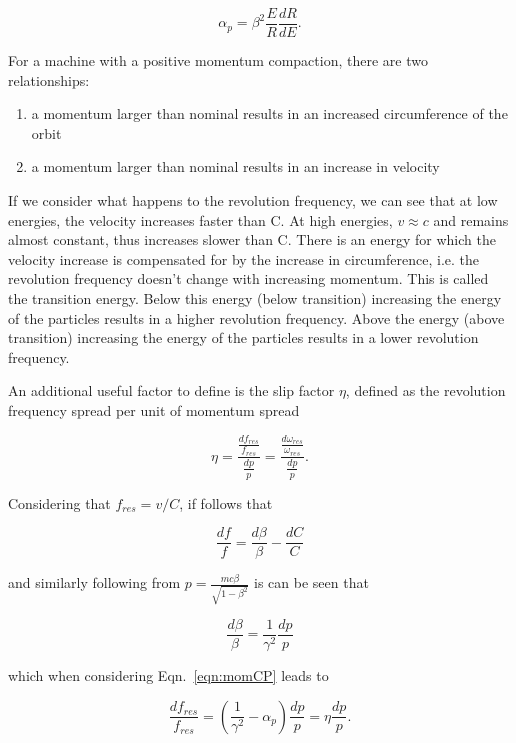 \begin{equation}
\alpha_{p} = \beta^{2}\frac{E}{R}\frac{dR}{dE}.
\end{equation}

For a machine with a positive momentum compaction, there are two relationships:

\begin{enumerate}
\item{a momentum larger than nominal results in an increased circumference of the orbit}
\item{a momentum larger than nominal results in an increase in velocity}
\end{enumerate}

If we consider what happens to the revolution frequency, we can see that at low energies, the velocity increases faster than C. At high energies, $v \approx c$ and remains almost constant, thus increases slower than C. There is an energy for which the velocity increase is compensated for by the increase in circumference, i.e. the revolution frequency doesn't change with increasing momentum. This is called the transition energy. Below this energy (below transition) increasing the energy of the particles results in a higher revolution frequency. Above the energy (above transition) increasing the energy of the particles results in a lower revolution frequency.

An additional useful factor to define is the slip factor $\eta$, defined as the revolution frequency spread per unit of momentum spread

\begin{equation}
\eta = \frac{\frac{df_{res}}{f_{res}}}{\frac{dp}{p}} = \frac{\frac{d\omega_{res}}{\omega_{res}}}{\frac{dp}{p}}.
\end{equation}

Considering that $f_{res} = v/C$, if follows that

\begin{equation}
\frac{df}{f} = \frac{d\beta}{\beta} - \frac{dC}{C}
\end{equation}

and similarly following from $p=\frac{mc\beta}{\sqrt{1-\beta^{2}}}$ is can be seen that

\begin{equation}
\frac{d\beta}{\beta} = \frac{1}{\gamma^{2}}\frac{dp}{p}
\end{equation}

which when considering Eqn.~\ref{eqn:momCP} leads to 

\begin{equation}
\frac{df_{res}}{f_{res}} = \left( \frac{1}{\gamma^{2}} -\alpha_{p}\right) \frac{dp}{p} = \eta \frac{dp}{p}.
\end{equation}

